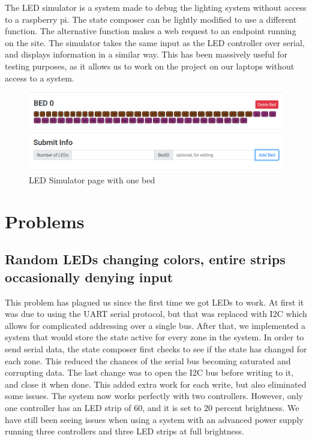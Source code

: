 \documentclass[onecolumn, draftclsnofoot,10pt, compsoc]{IEEEtran}
\begin{document}
	The LED simulator is a system made to debug the lighting system without access to a raspberry pi.
	The state composer can be lightly modified to use a different function. The alternative function makes a web request to an endpoint running on the site.
	The simulator takes the same input as the LED controller over serial, and displays information in a similar way.
	This has been massively useful for testing purposes, as it allows us to work on the project on our laptops without access to a system.

	\begin{center}
		\begin{figure}[H]
			\includegraphics[width=\linewidth]{site/simulator.png}
			\caption{LED Simulator page with one bed}
			\label{fig:siteSimulator}
		\end{figure}
	\end{center}
	

	\section{Problems}
		\subsection{Random LEDs changing colors, entire strips occasionally denying input}
			This problem has plagued us since the first time we got LEDs to work.
			At first it was due to using the UART serial protocol, but that was replaced with I2C which allows for complicated addressing over a single bus.
			After that, we implemented a system that would store the state active for every zone in the system.
			In order to send serial data, the state composer first checks to see if the state has changed for each zone.
			This reduced the chances of the serial bus becoming saturated and corrupting data.
			The last change was to open the I2C bus before writing to it, and close it when done. This added extra work for each write, but also eliminated some issues.
			The system now works perfectly with two controllers. However, only one controller has an LED strip of 60, and it is set to 20 percent brightness.
			We have still been seeing issues when using a system with an advanced power supply running three controllers and three LED strips at full brightness.
			
\end{document}
